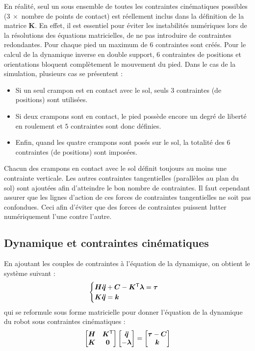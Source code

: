 En réalité, seul un sous ensemble de toutes les contraintes cinématiques possibles
($3~\times$ nombre de points de contact) est
réellement inclus dans la définition de la matrice $\bm{K}$.
En effet, il est essentiel pour éviter les instabilités numériques
lors de la résolutions des équations matricielles, de ne pas introduire
de contraintes redondantes.
Pour chaque pied un maximum de $6$ contraintes sont créés.
Pour le calcul de la dynamique inverse en double support, 
$6$ contraintes de positions et orientations bloquent 
complètement le mouvement du pied.
Dans le cas de la simulation, plusieurs cas se présentent :
\begin{itemize}
    \item Si un seul crampon est en contact avec le sol,
        seuls $3$ contraintes (de positions) sont utilisées.
    \item Si deux crampons sont en contact, le pied possède encore
        un degré de liberté en roulement et $5$ contraintes sont donc définies.
    \item Enfin, quand les quatre crampons sont posés sur le sol, 
        la totalité des $6$ contraintes (de positions) sont imposées.
\end{itemize}
Chacun des crampons en contact avec le sol définit toujours 
au moins une contrainte verticale.
Les autres contraintes tangentielles (parallèles au plan du sol) 
sont ajoutées afin d'atteindre le bon nombre de contraintes.
Il faut cependant assurer que les lignes d'action de ces forces de contraintes
tangentielles ne soit pas confondues.
Ceci afin d'éviter que des forces de contraintes puissent 
\og lutter \fg numériquement l'une contre l'autre.

\subsection{Dynamique et contraintes cinématiques\label{sec:dynamics_constraints}}

En ajoutant les couples de contraintes
à l'équation de la dynamique, on obtient le système suivant :
$$
\begin{cases}
\bm{H}\bm{\ddot{q}} + \bm{C} - \bm{K}^{\mathsf{T}}\bm{\lambda} = \bm{\tau} \\
\bm{K}\bm{\ddot{q}} = \bm{k}
\end{cases}
$$
qui se reformule sous forme matricielle pour donner l'équation
de la dynamique du robot sous contraintes cinématiques :
$$
\begin{bmatrix}
    \bm{H} & \bm{K}^{\mathsf{T}} \\
    \bm{K} & \bm{0} \\
\end{bmatrix}
\begin{bmatrix}
    \bm{\ddot{q}} \\
    -\bm{\lambda} \\
\end{bmatrix}
=
\begin{bmatrix}
    \bm{\tau} - \bm{C} \\
    \bm{k} \\
\end{bmatrix}
$$

